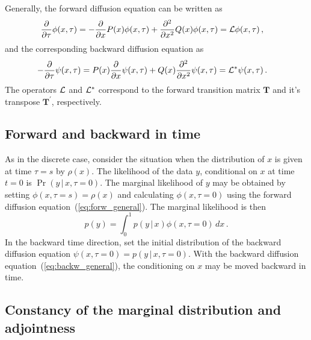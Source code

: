 \documentclass[preprint]{elsarticle}
\newcommand\given{{\,|\,}}
\newcommand\s{\ensuremath{s}}
\begin{document}
Generally, the forward diffusion equation can be written as
\begin{equation}\label{eq:forw_general}
\begin{split}
\frac{\partial}{\partial \tau}\phi(x,\tau)&=-\frac{\partial}{\partial x} P(x)\phi(x,\tau)+\frac{\partial^2}{\partial x^2} Q(x) \phi(x,\tau) = {\cal L} \phi(x, \tau)\,,
\end{split}
\end{equation}
and the corresponding backward diffusion equation as
\begin{equation}\label{eq:backw_general}
\begin{split}
-\frac{\partial}{\partial \tau}\psi(x,\tau)&=P(x)\frac{\partial}{\partial x} \psi(x,\tau)+Q(x)\frac{\partial^2}{\partial x^2} \psi(x,\tau) = {\cal L}^{*} \psi(x, \tau)\,.
\end{split}
\end{equation}
The operators ${\cal L}$ and ${\cal L}^{*}$ correspond to the forward transition matrix $\mathbf{T}$ and it's transpose $\mathbf{T}^{'}$, respectively.

\subsection{Forward and backward in time}

As in the discrete case, consider the situation when the distribution of $x$ is given at time $\tau=\s$ by $\rho(x)$. The likelihood of the data $y$, conditional on $x$ at time $t=0$ is $\Pr(y\given x,\tau=0)$. The marginal likelihood of $y$ may be obtained by setting $\phi(x,\tau=\s)=\rho(x)$ and calculating $\phi(x,\tau=0)$ using the forward diffusion equation~(\ref{eq:forw_general}). The marginal likelihood is then
\begin{equation}\label{eq:marg_like2}
p(y)= \int_{0}^{1} p(y\given x)\phi(x,\tau=0) \,dx\,.
\end{equation}
In the backward time direction, set the initial distribution of the backward diffusion equation  $\psi(x,\tau=0)=p(y\given x,\tau=0)$. With the backward diffusion equation~(\ref{eq:backw_general}), the conditioning on $x$ may be moved backward in time. 

\subsection{Constancy of the marginal distribution and adjointness}
\end{document}
